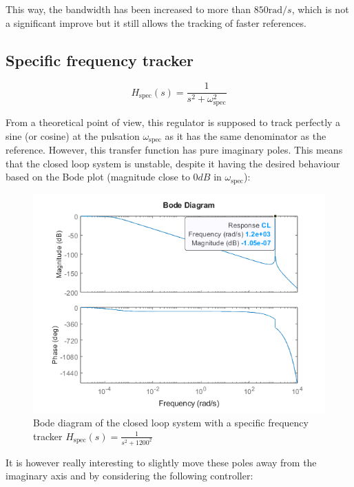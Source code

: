 This way, the bandwidth has been increased to more than $850 \text{rad}/s$, which is not a significant improve but it
still allows the tracking of faster references.

\subsection{Specific frequency tracker}

\begin{equation}
    H_{\text{spec}}(s) = \frac{1}{s^2 + \omega_{\text{spec}}^2}
\end{equation}

From a theoretical point of view, this regulator is supposed to track perfectly a sine (or cosine) at the pulsation
$\omega_{\text{spec}}$ as it has the same denominator as the reference. However, this transfer function has pure 
imaginary poles. This means that the closed loop system is unstable, despite it having the desired behaviour based on
the Bode plot (magnitude close to $0 dB$ in $\omega_{\text{spec}}$):

\begin{figure}[H]
    \centering
    \includegraphics[height=\textheight/3]{Pictures/annex_spec_im.png}
    \caption{Bode diagram of the closed loop system with a specific frequency tracker $H_{\text{spec}}(s) = \frac{1}{s^2
    +1200^2}$}
\end{figure}

It is however really interesting to slightly move these poles away from the imaginary axis and by considering the 
following controller:

